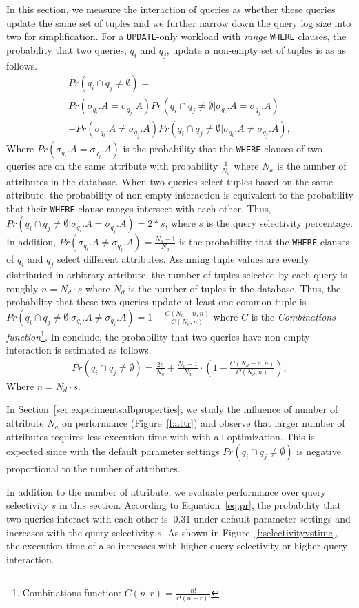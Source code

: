 In this section, we measure the interaction of queries as whether these queries update the same set of tuples and we further 
narrow down the query log size into two for simplification. For a \texttt{UPDATE}-only workload with \textit{range} \texttt{WHERE} clauses, 
the probability that two queries, $q_i$ and $q_j$, update a non-empty set of tuples is as as follows.
\begin{multline*}
Pr(q_i\cap q_j \neq \emptyset) =\\ 
Pr(\sigma_{q_i}.A= \sigma_{q_j}.A)Pr(q_i\cap q_j \neq \emptyset |\sigma_{q_i}.A= \sigma_{q_j}.A) \\
+ Pr(\sigma_{q_i}.A\neq \sigma_{q_j}.A)Pr(q_i\cap q_j \neq \emptyset |\sigma_{q_i}.A\neq \sigma_{q_j}.A), 
\end{multline*}
Where $Pr(\sigma_{q_i}.A= \sigma_{q_j}.A)$ is the probability that the \texttt{WHERE} clauses of two queries are on the same attribute with probability $\frac{1}{N_a}$
where $N_a$ is the number of attributes in the database. When two queries select tuples based on the same attribute, 
the probability of non-empty interaction is equivalent to the probability 
that their \texttt{WHERE} clause ranges intersect with each other. Thus, $Pr(q_i\cap q_j \neq \emptyset |\sigma_{q_i}.A= \sigma_{q_j}.A) = 2*s$, where
 $s$ is the query selectivity percentage. In addition, $Pr(\sigma_{q_i}.A\neq  \sigma_{q_j}.A) = \frac{N_a-1}{N_a}$ is the probability that the \texttt{WHERE} clauses
of $q_i$ and $q_j$ select different attributes.  Assuming tuple values are evenly distributed in arbitrary attribute, the number of tuples selected by each query is roughly $n = N_d \cdot s$ where $N_d$ is the number of tuples in the database. Thus, the probability that these two queries update at least one common tuple is $Pr(q_i\cap q_j \neq \emptyset |\sigma_{q_i}.A\neq \sigma_{q_j}.A) = 1 - \frac{C(N_d - n, n)}{C(N_d, n)}$ where $C$ is the \textit{Combinations function}\footnote{Combinations function: $C(n,r) = \frac{n!}{r!(n-r)!}$}. In conclude, the probability that two queries have non-empty interaction is estimated as follows.
\begin{multline} \label{eq:pr}
Pr(q_i\cap q_j \neq \emptyset) = \frac{2s}{N_a} + \frac{N_a-1}{N_a} \cdot (1 - \frac{C(N_d - n, n)}{C(N_d, n)}), 
\end{multline}
Where $n = N_d \cdot s$.

In Section~\ref{sec:experiments:dbproperties}, we study the influence of number of attribute $N_a$ on \sys performance (Figure~\ref{f:attr}) and observe that larger number of attributes requires less execution time with \sys with all optimization. This is expected since with the default parameter settings $Pr(q_i\cap q_j \neq \emptyset)$ is negative proportional to the number of attributes.

In addition to the number of attribute, we evaluate \sys performance over query selectivity $s$ in this section. According to Equation~\ref{eq:pr},  the probability that two queries interact with each other is $~0.31$ under default parameter settings and increases with the query selectivity $s$. As shown in Figure~\ref{f:selectivityvstime}, the execution time of \sys also increases with higher query selectivity or higher query interaction. 


\pagebreak